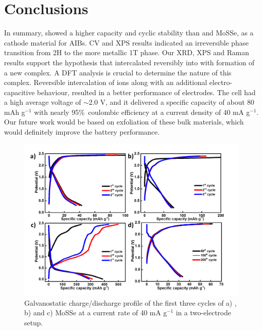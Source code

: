 \section{Conclusions}
In summary,  showed a higher capacity and cyclic stability than  and MoSSe, as a cathode material for AIBs. CV and XPS results indicated an irreversible phase transition from 2H to the more metallic 1T phase. Our XRD, XPS and Raman results support the hypothesis that  intercalated reversibly into  with formation of a new complex. A DFT analysis is crucial to determine the nature of this complex. Reversible intercalation of ions along with an additional electro-capacitive behaviour, resulted in a better performance of  electrodes. The cell had a high average voltage of $\sim$2.0 V, and it delivered a specific capacity of about 80 mAh g$^{-1}$ with nearly 95\%\ coulombic efficiency at a current density of 40 mA g$^{-1}$. Our future work would be based on exfoliation of these bulk materials, which would definitely improve the battery performance. 

\begin{figure}[htb!]
\centering
\includegraphics[width=\textwidth]{Figures/chap4fig/S1}
\caption{Galvanostatic charge/discharge profile of the first three cycles of a) , b)  and c) MoSSe at a current rate of 40 mA g$^{-1}$ in a two-electrode setup.}
\label{Figures/chap4fig:S1}
\end{figure}


